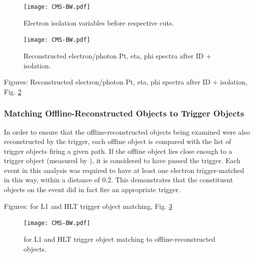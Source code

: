  \begin{figure}[htb]
  \begin{center}
    \texttt{[image: CMS-BW.pdf]}
  \end{center}
  \caption[Electron isolation variables before respective cuts]{Electron isolation variables before respective cuts.}
  \label{fig:ElecIsoVars}
 \end{figure}



 \begin{figure}[htb]
  \begin{center}
    \texttt{[image: CMS-BW.pdf]}
  \end{center}
  \caption[Reconstructed electron/photon Pt, eta, phi spectra after ID + isolation]{Reconstructed electron/photon Pt, eta, phi spectra after ID + isolation.}
  \label{fig:RecoSpectraAfterEidEiso}
 \end{figure}

Figures: Reconstructed electron/photon Pt, eta, phi spectra after ID + isolation, Fig. \ref{fig:RecoSpectraAfterEidEiso}


\subsubsection{Matching Offline-Reconstructed Objects to Trigger Objects}
\label{evSel:matching}
In order to ensure that the offline-reconstructed objects being examined were also reconstructed by the trigger, 
each offline object is compared with the list of trigger objects firing a given path.  
If the offline object lies close enough to a trigger object (measured by \DR), 
it is considered to have passed the trigger.  
Each event in this analysis was required to have at least one electron trigger-matched in this way, 
within a \DR distance of 0.2.  
This demonstrates that the constituent objects on the event did in fact fire an appropriate trigger.  

Figures: \DR for L1 and HLT trigger object matching, Fig. \ref{fig:TriggerObjectSelectionDeltaR}

 \begin{figure}[htb]
  \begin{center}
    \texttt{[image: CMS-BW.pdf]}
  \end{center}
  \caption[\DR for L1 and HLT trigger object matching to offline for electron selection]{\DR for L1 and HLT trigger object matching to offline-reconstructed objects.}
  \label{fig:TriggerObjectSelectionDeltaR}
 \end{figure}


